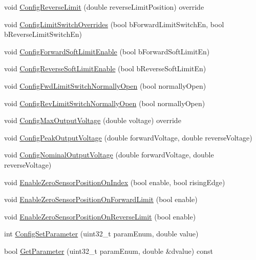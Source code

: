 \begin{DoxyCompactItemize}
void \hyperlink{class_c_a_n_talon_ac582a9df1a7224feb27de1c8dbda5ddf}{Config\+Reverse\+Limit} (double reverse\+Limit\+Position) override
\item 
void \hyperlink{class_c_a_n_talon_a2b70b503b3ea36373884d218be87a5d0}{Config\+Limit\+Switch\+Overrides} (bool b\+Forward\+Limit\+Switch\+En, bool b\+Reverse\+Limit\+Switch\+En)
\item 
void \hyperlink{class_c_a_n_talon_abd712f1d6f0a2be509e590437532141a}{Config\+Forward\+Soft\+Limit\+Enable} (bool b\+Forward\+Soft\+Limit\+En)
\item 
void \hyperlink{class_c_a_n_talon_ad0292230bcd7e6431dd0637b1e130a70}{Config\+Reverse\+Soft\+Limit\+Enable} (bool b\+Reverse\+Soft\+Limit\+En)
\item 
void \hyperlink{class_c_a_n_talon_a5da34dc5d266817f0a666868f20429d8}{Config\+Fwd\+Limit\+Switch\+Normally\+Open} (bool normally\+Open)
\item 
void \hyperlink{class_c_a_n_talon_a247a8434375eb32171058d61f366e7be}{Config\+Rev\+Limit\+Switch\+Normally\+Open} (bool normally\+Open)
\item 
void \hyperlink{class_c_a_n_talon_a6096b39afee6f6c6595d1fed5369a15b}{Config\+Max\+Output\+Voltage} (double voltage) override
\item 
void \hyperlink{class_c_a_n_talon_a123f54ab4a1c1c741349de9f5db675fe}{Config\+Peak\+Output\+Voltage} (double forward\+Voltage, double reverse\+Voltage)
\item 
void \hyperlink{class_c_a_n_talon_a1d35425facbcfd512003c545dfe81861}{Config\+Nominal\+Output\+Voltage} (double forward\+Voltage, double reverse\+Voltage)
\item 
void \hyperlink{class_c_a_n_talon_a9a7de9cdd37714741fe25c30ed53e071}{Enable\+Zero\+Sensor\+Position\+On\+Index} (bool enable, bool rising\+Edge)
\item 
void \hyperlink{class_c_a_n_talon_a2ab734332c2c8f1ff2a1db635058cfe4}{Enable\+Zero\+Sensor\+Position\+On\+Forward\+Limit} (bool enable)
\item 
void \hyperlink{class_c_a_n_talon_af21066f2a72e47bcce1640f22ed419f0}{Enable\+Zero\+Sensor\+Position\+On\+Reverse\+Limit} (bool enable)
\item 
int \hyperlink{class_c_a_n_talon_a3b5993220e40d12ebf6d755434783496}{Config\+Set\+Parameter} (uint32\+\_\+t param\+Enum, double value)
\item 
bool \hyperlink{class_c_a_n_talon_ac3fc867de74a9174eab5c1aaa3ddb3b5}{Get\+Parameter} (uint32\+\_\+t param\+Enum, double \&dvalue) const
\item 

\end{DoxyCompactItemize}
